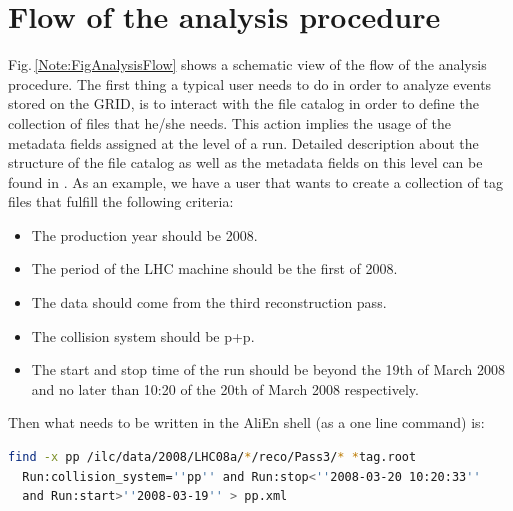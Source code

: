 \section{Flow of the analysis procedure}
\label{Note:FLOW}

Fig.\,\ref{Note:FigAnalysisFlow} shows a schematic view of the flow of the analysis procedure. The first thing a typical user needs to do in order to analyze events stored on the GRID, is to interact with the file catalog in order to define the collection of files that he/she needs. This action implies the usage of the metadata fields assigned at the level of a run. Detailed description about the structure of the file catalog as well as the metadata fields on this level can be found in \cite{Note:RefFileCatalogMetadataNote,Note:RefFileCatalogMetadataWeb}. As an example, we have a user that wants to create a collection of tag files that fulfill the following criteria:

\begin{itemize}
\item The production year should be 2008.
\item The period of the LHC machine should be the first of 2008.
\item The data should come from the third reconstruction pass.
\item The collision system should be p+p.
\item The start and stop time of the run should be beyond the 19th of March 2008 and no later than 10:20 of the 20th of March 2008 respectively.
\end{itemize}

\noindent Then what needs to be written in the AliEn shell \cite{Note:RefFileCatalogMetadataWeb} (as a one line command) is:

\begin{lstlisting}[language=sh]
  find -x pp /ilc/data/2008/LHC08a/*/reco/Pass3/* *tag.root 
  Run:collision_system=''pp'' and Run:stop<''2008-03-20 10:20:33'' 
  and Run:start>''2008-03-19'' > pp.xml
\end{lstlisting}

